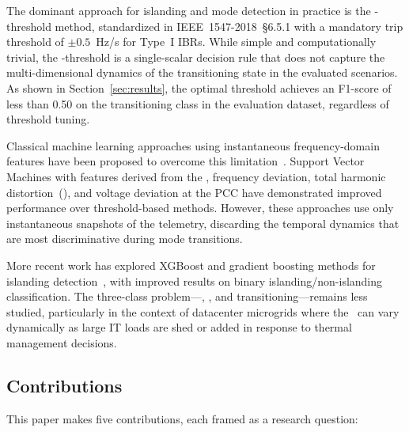 \documentclass[journal]{IEEEtran}
\newcommand{\rocof}{\text{RoCoF}}
\newcommand{\thd}{\text{THD}}
\newcommand{\scr}{\text{SCR}}
\newcommand{\gfl}{\text{GFL}}
\newcommand{\gfm}{\text{GFM}}
\begin{document}
The dominant approach for islanding and mode detection in practice is the
\rocof-threshold method, standardized in IEEE~1547-2018~§6.5.1 with a
mandatory trip threshold of $\pm 0.5$~Hz/s for Type~I IBRs.
While simple and computationally trivial, the \rocof-threshold is a
single-scalar decision rule that does not capture the
multi-dimensional dynamics of the transitioning state in the evaluated scenarios.
As shown in Section~\ref{sec:results}, the optimal threshold achieves
an F1-score of less than 0.50 on the transitioning class in the
evaluation dataset, regardless of threshold tuning.

Classical machine learning approaches using instantaneous
frequency-domain features have been proposed to overcome this
limitation~\cite{b_svm_islanding}.
Support Vector Machines with features derived from the \rocof,
frequency deviation, total harmonic distortion~(\thd), and
voltage deviation at the PCC have demonstrated improved performance
over threshold-based methods.
However, these approaches use only instantaneous snapshots of the
telemetry, discarding the temporal dynamics that are most discriminative
during mode transitions.

More recent work has explored XGBoost and gradient boosting methods for
islanding detection~\cite{b_xgb_islanding}, with improved results on
binary islanding/non-islanding classification.
The three-class problem---\gfl, \gfm, and transitioning---remains
less studied, particularly in the context of datacenter microgrids
where the \scr\ can vary dynamically as large IT loads are shed or
added in response to thermal management decisions.

\subsection{Contributions}

This paper makes five contributions, each framed as a research question:
\end{document}
